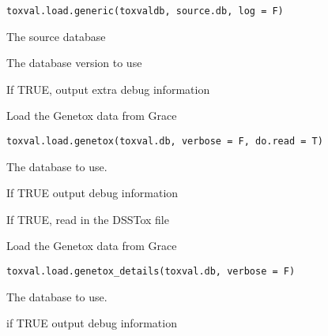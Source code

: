\documentclass[letterpaper]{book}
\begin{document}
%
\begin{Usage}
\begin{verbatim}
toxval.load.generic(toxvaldb, source.db, log = F)
\end{verbatim}
\end{Usage}
%
\begin{Arguments}
\begin{ldescription}
\item[\code{source.db}] The source database

\item[\code{toxval.db}] The database version to use

\item[\code{verbose}] If TRUE, output extra debug information
\end{ldescription}
\end{Arguments}
%
\begin{Description}\relax
Load the Genetox data from Grace
\end{Description}
%
\begin{Usage}
\begin{verbatim}
toxval.load.genetox(toxval.db, verbose = F, do.read = T)
\end{verbatim}
\end{Usage}
%
\begin{Arguments}
\begin{ldescription}
\item[\code{toxval.db}] The database to use.

\item[\code{verbose}] If TRUE output debug information

\item[\code{do.read}] If TRUE, read in the DSSTox file
\end{ldescription}
\end{Arguments}
%
\begin{Description}\relax
Load the Genetox data from Grace
\end{Description}
%
\begin{Usage}
\begin{verbatim}
toxval.load.genetox_details(toxval.db, verbose = F)
\end{verbatim}
\end{Usage}
%
\begin{Arguments}
\begin{ldescription}
\item[\code{toxval.db}] The database to use.

\item[\code{verbose}] if TRUE output debug information
\end{ldescription}
\end{Arguments}
\end{document}
